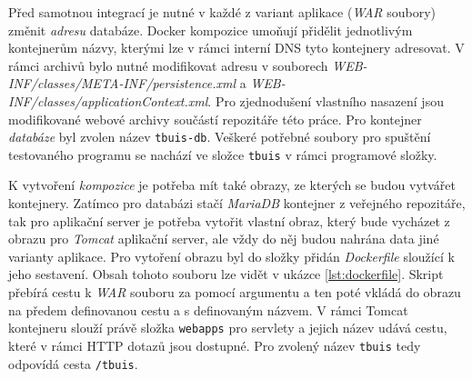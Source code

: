 \documentclass[czech, ma, kiv, he, iso690numb, pdf, viewonly]{fasthesis}
\begin{document}
    Před samotnou integrací je nutné v každé z variant aplikace (\textit{WAR} soubory) změnit \textit{adresu} databáze. Docker kompozice umoňují přidělit jednotlivým kontejnerům názvy, kterými lze v rámci interní DNS tyto kontejnery adresovat. V rámci archivů bylo nutné modifikovat adresu v souborech \textit{WEB-INF/classes/META-INF/persistence.xml} a \textit{WEB-INF/classes/applicationContext.xml}. Pro zjednodušení vlastního nasazení jsou modifikované webové archivy součástí repozitáře této práce. Pro kontejner \textit{databáze} byl zvolen název \verb|tbuis-db|. Veškeré potřebné soubory pro spuštění testovaného programu se nachází ve složce \verb|tbuis| v rámci programové složky.

    K vytvoření \textit{kompozice} je potřeba mít také obrazy, ze kterých se budou vytvářet kontejnery. Zatímco pro databázi stačí \textit{MariaDB} kontejner z veřejného repozitáře, tak pro aplikační server je potřeba vytořit vlastní obraz, který bude vycházet z obrazu pro \textit{Tomcat} aplikační server, ale vždy do něj budou nahrána data jiné varianty aplikace. Pro vytoření obrazu byl do složky přidán \textit{Dockerfile} sloužící k jeho sestavení. Obsah tohoto souboru lze vidět v ukázce \ref{lst:dockerfile}. Skript přebírá cestu k \textit{WAR} souboru za pomocí argumentu a ten poté vkládá do obrazu na předem definovanou cestu a s definovaným názvem. V rámci Tomcat kontejneru slouží právě složka \verb|webapps| pro servlety a jejich název udává cestu, které v rámci HTTP dotazů jsou dostupné. Pro zvolený název \verb|tbuis| tedy odpovídá cesta \verb|/tbuis|.

\end{document}
